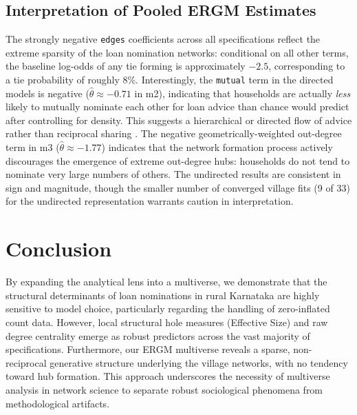 \documentclass[11pt,a4paper]{article}
\begin{document}
\subsection{Interpretation of Pooled ERGM Estimates}

The strongly negative \texttt{edges} coefficients across all specifications reflect the extreme sparsity of the loan nomination networks: conditional on all other terms, the baseline log-odds of any tie forming is approximately $-2.5$, corresponding to a tie probability of roughly 8\%. Interestingly, the \texttt{mutual} term in the directed models is negative ($\hat{\theta} \approx -0.71$ in m2), indicating that households are actually \textit{less} likely to mutually nominate each other for loan advice than chance would predict after controlling for density. This suggests a hierarchical or directed flow of advice rather than reciprocal sharing \citep{Lazega2001}. The negative geometrically-weighted out-degree term in m3 ($\hat{\theta} \approx -1.77$) indicates that the network formation process actively discourages the emergence of extreme out-degree hubs: households do not tend to nominate very large numbers of others. The undirected results are consistent in sign and magnitude, though the smaller number of converged village fits (9 of 33) for the undirected representation warrants caution in interpretation.

\section{Conclusion}
By expanding the analytical lens into a multiverse, we demonstrate that the structural determinants of loan nominations in rural Karnataka are highly sensitive to model choice, particularly regarding the handling of zero-inflated count data. However, local structural hole measures (Effective Size) and raw degree centrality emerge as robust predictors across the vast majority of specifications. Furthermore, our ERGM multiverse reveals a sparse, non-reciprocal generative structure underlying the village networks, with no tendency toward hub formation. This approach underscores the necessity of multiverse analysis in network science to separate robust sociological phenomena from methodological artifacts.



\end{document}
